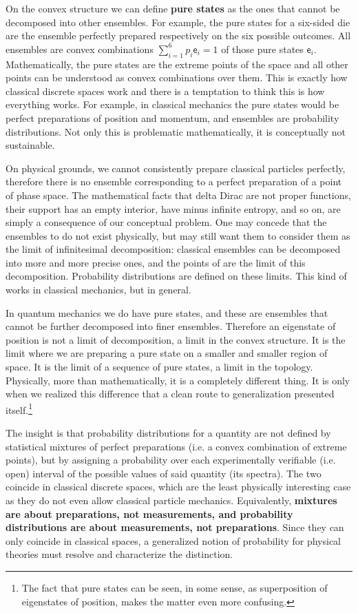 \documentclass[10pt,twocolumn, nofootinbib]{revtex4-2}
\newcommand{\ens}[1][e] {\mathsf{#1}} %
\begin{document}
On the convex structure we can define \textbf{pure states} as the ones that cannot be decomposed into other ensembles. For example, the pure states for a six-sided die are the ensemble perfectly prepared respectively on the six possible outcomes. All ensembles are convex combinations $\sum_{i=1}^{6} p_i \ens_i = 1$ of those pure states $\ens_i$. Mathematically, the pure states are the extreme points of the space and all other points can be understood as convex combinations over them. This is exactly how classical discrete spaces work and there is a temptation to think this is how everything works. For example, in classical mechanics the pure states would be perfect preparations of position and momentum, and ensembles are probability distributions. Not only this is problematic mathematically, it is conceptually not sustainable.

On physical grounds, we cannot consistently prepare classical particles perfectly, therefore there is no ensemble corresponding to a perfect preparation of a point of phase space. The mathematical facts that delta Dirac are not proper functions, their support has an empty interior, have minus infinite entropy, and so on, are simply a consequence of our conceptual problem. One may concede that the ensembles to do not exist physically, but may still want them to consider them as the limit of infinitesimal decomposition: classical ensembles can be decomposed into more and more precise ones, and the points of are the limit of this decomposition. Probability distributions are defined on these limits. This kind of works in classical mechanics, but in general.

In quantum mechanics we do have pure states, and these are ensembles that cannot be further decomposed into finer ensembles. Therefore an eigenstate of position is not a limit of decomposition, a limit in the convex structure. It is the limit where we are preparing a pure state on a smaller and smaller region of space. It is the limit of a sequence of pure states, a limit in the topology. Physically, more than mathematically, it is a completely different thing. It is only when we realized this difference that a clean route to generalization presented itself.\footnote{The fact that pure states can be seen, in some sense, as superposition of eigenstates of position, makes the matter even more confusing.}

The insight is that probability distributions for a quantity are not defined by statistical mixtures of perfect preparations (i.e. a convex combination of extreme points), but by assigning a probability over each experimentally verifiable (i.e. open) interval of the possible values of said quantity (its spectra). The two coincide in classical discrete spaces, which are the least physically interesting case as they do not even allow classical particle mechanics. Equivalently, \textbf{mixtures are about preparations, not measurements, and probability distributions are about measurements, not preparations}. Since they can only coincide in classical spaces, a generalized notion of probability for physical theories must resolve and characterize the distinction.
\end{document}
